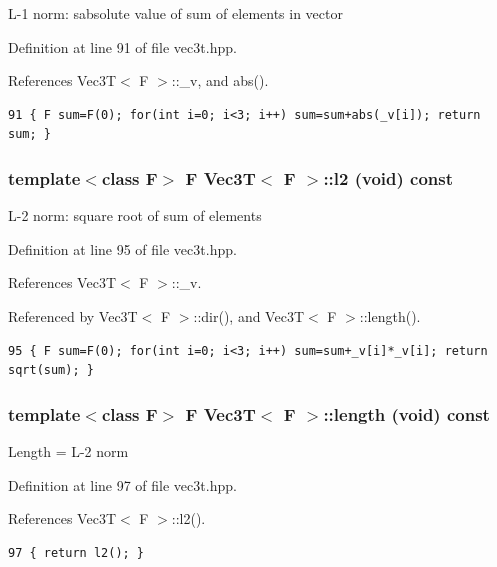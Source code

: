L-1 norm: sabsolute value of sum of elements in vector 

Definition at line 91 of file vec3t.hpp.

References Vec3T$<$ F $>$::\_\-v, and abs().

\footnotesize\begin{verbatim}91 { F sum=F(0); for(int i=0; i<3; i++) sum=sum+abs(_v[i]); return sum; }
\end{verbatim}\normalsize 


\subsubsection{\setlength{\rightskip}{0pt plus 5cm}template$<$class F$>$ F {\bf Vec3T}$<$ F $>$::l2 (void) const\hspace{0.3cm}{\tt  [inline]}}\label{classVec3T_ba4174b2dda6a79f2501cbc9eaf2c3a0_ba4174b2dda6a79f2501cbc9eaf2c3a0}


L-2 norm: square root of sum of elements 

Definition at line 95 of file vec3t.hpp.

References Vec3T$<$ F $>$::\_\-v.

Referenced by Vec3T$<$ F $>$::dir(), and Vec3T$<$ F $>$::length().

\footnotesize\begin{verbatim}95 { F sum=F(0); for(int i=0; i<3; i++) sum=sum+_v[i]*_v[i]; return sqrt(sum); }
\end{verbatim}\normalsize 


\subsubsection{\setlength{\rightskip}{0pt plus 5cm}template$<$class F$>$ F {\bf Vec3T}$<$ F $>$::length (void) const\hspace{0.3cm}{\tt  [inline]}}\label{classVec3T_e9614187f8e8bc75460d63171193e93c_e9614187f8e8bc75460d63171193e93c}


Length = L-2 norm 

Definition at line 97 of file vec3t.hpp.

References Vec3T$<$ F $>$::l2().

\footnotesize\begin{verbatim}97 { return l2(); }
\end{verbatim}\normalsize 


